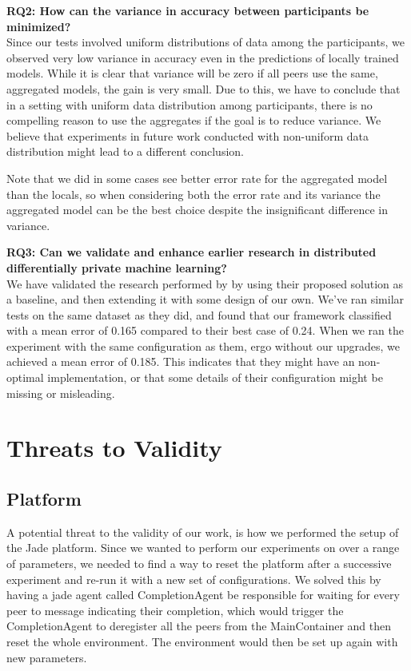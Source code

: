 \vspace{2mm}
\noindent
\textbf{RQ2: How can the variance in accuracy between participants be minimized?} \\
Since our tests involved uniform distributions of data among the participants, we observed very low variance in accuracy even in the predictions of locally trained models. While it is clear that variance will be zero if all peers use the same, aggregated models, the gain is very small. Due to this, we have to conclude that in a setting with uniform data distribution among participants, there is no compelling reason to use the aggregates if the goal is to reduce variance. We believe that experiments in future work conducted with non-uniform data distribution might lead to a different conclusion.

Note that we did in some cases see better error rate for the aggregated model than the locals, so when considering both the error rate and its variance the aggregated model can be the best choice despite the insignificant difference in variance.

\vspace{2mm}
\noindent
\textbf{RQ3: Can we validate and enhance earlier research in distributed differentially private machine learning?} \\
We have validated the research performed by \cite{pathak2010diffprivhomo} by using their proposed solution as a baseline, and then extending it with some design of our own. We've ran similar tests on the same dataset as they did, and found that our framework classified with a mean error of 0.165 compared to their best case of 0.24. When we ran the experiment with the same configuration as them, ergo without our upgrades, we achieved a mean error of 0.185. This indicates that they might have an non-optimal implementation, or that some details of their configuration might be missing or misleading. 

\section{Threats to Validity}

\subsection{Platform}
A potential threat to the validity of our work, is how we performed the setup of the Jade platform. Since we wanted to perform our experiments on over a range of parameters, we needed to find a way to reset the platform after a successive experiment and re-run it with a new set of configurations. We solved this by having a jade agent called CompletionAgent be responsible for waiting for every peer to message indicating their completion, which would trigger the CompletionAgent to deregister all the peers from the MainContainer and then reset the whole environment. The environment would then be set up again with new parameters. 

